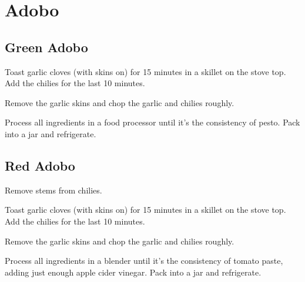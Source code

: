\section{Adobo}
\begin{recipe}


\subsection{Green Adobo}


Toast garlic cloves (with skins on) for 15 minutes in a skillet on the stove top. Add the chilies for the last 10 minutes.

Remove the garlic skins and chop the garlic and chilies roughly.

Process all ingredients in a food processor until it's the consistency of pesto. Pack into a jar and refrigerate.

\subsection{Red Adobo}


Remove stems from chilies.

Toast garlic cloves (with skins on) for 15 minutes in a skillet on the stove top. Add the chilies for the last 10 minutes.

Remove the garlic skins and chop the garlic and chilies roughly.

Process all ingredients in a blender until it's the consistency of tomato paste, adding just enough apple cider vinegar. Pack into a jar and refrigerate.

\end{recipe}
